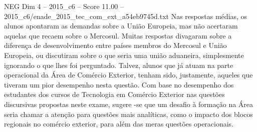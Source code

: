 \begin{textsample}{NEG Dim 4 – 2015\_c6 – Score 11.00 – 2015\_c6/enade\_2015\_tec\_com\_ext\_a54eb9745d.txt}
Nas respostas médias, os alunos apontaram as demandas sobre a União Europeia, mas não acertaram aquelas que recaem sobre o Mercosul.
Muitas respostas divagaram sobre a diferença de desenvolvimento entre países membros do Mercosul e União Europeia, ou discutiram sobre o que seria uma união aduaneira, simplesmente ignorando o que lhes foi perguntado.
Talvez, alunos que já atuam na parte operacional da Área de Comércio Exterior, tenham sido, justamente, aqueles que tiveram um pior desempenho nesta questão.
Com base no desempenho dos estudantes dos cursos de Tecnologia em Comércio Exterior nas questões discursivas propostas neste exame, sugere -se que um desafio à formação na Área seria chamar a atenção para questões mais analíticas, como o impacto dos blocos regionais no comércio exterior, para além das meras questões operacionais.

\end{textsample}
